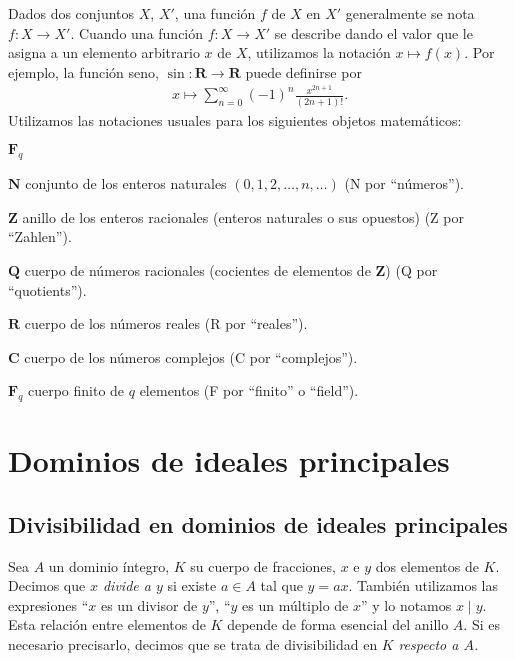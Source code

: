 \documentclass[oneside,bibtotoc,leqno,spanish]{amsbook}
\newcommand{\RR}{\mathbf{R}}
\newcommand{\QQ}{\mathbf{Q}}
\newcommand{\ZZ}{\mathbf{Z}}
\newcommand{\NN}{\mathbf{N}}
\newcommand{\FF}{\mathbf{F}}
\newcommand{\CC}{\mathbf{C}}
\renewcommand{\to}[1][]{\xrightarrow{#1}}
\numberwithin{equation}{section}
\theoremstyle{defi}
\theoremstyle{note}
\theoremstyle{rem}
\numberwithin{theorem}{section}
\numberwithin{proposition}{section}
\numberwithin{definition}{section}
\numberwithin{lemma}{section}
\numberwithin{corollary}{section}
\numberwithin{example}{section}
\numberwithin{footnote}{section}%
\begin{document}
Dados dos conjuntos $X$, $X'$, una funci\'on $f$ de $X$ en $X'$ generalmente se nota
$f:X\to X'$. Cuando una funci\'on $f:X\to X'$ se describe dando el valor que
le asigna a un elemento arbitrario $x$ de $X$, utilizamos la notaci\'on $x\mapsto f(x)$.
Por ejemplo, la funci\'on seno, $\sin:\RR\to\RR$ puede definirse por
\begin{gather*}
x\mapsto\sum_{n=0}^{\infty}(-1)^{n}\frac{x^{2n+1}}{(2n+1)!}.
\end{gather*}
Utilizamos las notaciones usuales para los siguientes objetos matem\'aticos:
\begin{labeling}[:]{$\FF_{q}$}
\item[$\NN$] conjunto de los enteros naturales $(0,1,2,\dots,n,\dots)$ (N por ``n\'umeros'').
\item[$\ZZ$] anillo de los enteros racionales (enteros naturales o sus opuestos)
(Z por ``Zahlen'').
\item[$\QQ$] cuerpo de n\'umeros racionales (cocientes de elementos de $\ZZ$) (Q por
``quotients'').
\item[$\RR$] cuerpo de los n\'umeros reales (R por ``reales'').
\item[$\CC$] cuerpo de los n\'umeros complejos (C por ``complejos'').
\item[$\FF_{q}$] cuerpo finito de $q$ elementos (F por ``finito'' o ``field'').
\end{labeling}

\mainmatter

\chapter{Dominios de ideales principales}\label{cap1}

\section{Divisibilidad en dominios de ideales principales}\label{sec1.1}

Sea $A$ un dominio \'integro, $K$ su cuerpo de fracciones, $x$ e $y$ dos elementos de $K$.
Decimos que \emph{$x$ divide a $y$} si existe $a\in A$ tal que $y = ax$. Tambi\'en utilizamos
las expresiones ``$x$ es un divisor de $y$'', ``$y$ es un m\'ultiplo de $x$'' y lo notamos $x\mid y$.
Esta relaci\'on entre elementos de $K$ depende de forma esencial del anillo $A$. Si es necesario
precisarlo, decimos que se trata de divisibilidad en $K$ \emph{respecto a $A$.}
\end{document}
